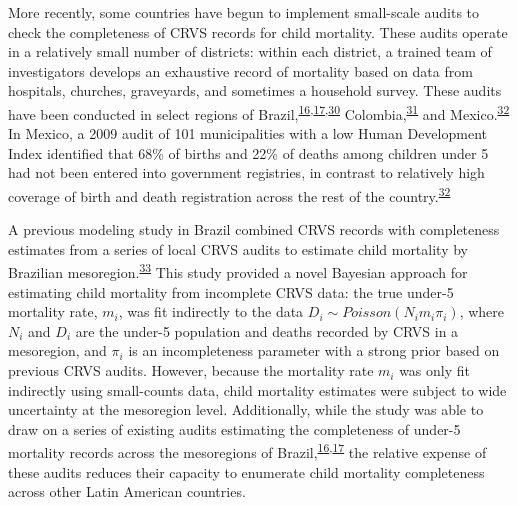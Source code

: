 \documentclass[
]{article}
\begin{document}
More recently, some countries have begun to implement small-scale audits to check the completeness of CRVS records for child mortality. These audits operate in a relatively small number of districts: within each district, a trained team of investigators develops an exhaustive record of mortality based on data from hospitals, churches, graveyards, and sometimes a household survey. These audits have been conducted in select regions of Brazil,\textsuperscript{\protect\hyperlink{ref-DeFrias2013}{16},\protect\hyperlink{ref-Szwarcwald2014}{17},\protect\hyperlink{ref-DeAlmeida2017a}{30}} Colombia,\textsuperscript{\protect\hyperlink{ref-NationalAdminstrativeDepartmentofStatisticsDANE2006}{31}} and Mexico.\textsuperscript{\protect\hyperlink{ref-Hernandez2012}{32}} In Mexico, a 2009 audit of 101 municipalities with a low Human Development Index identified that 68\% of births and 22\% of deaths among children under 5 had not been entered into government registries, in contrast to relatively high coverage of birth and death registration across the rest of the country.\textsuperscript{\protect\hyperlink{ref-Hernandez2012}{32}}

A previous modeling study in Brazil combined CRVS records with completeness estimates from a series of local CRVS audits to estimate child mortality by Brazilian mesoregion.\textsuperscript{\protect\hyperlink{ref-Schmertmann2018a}{33}} This study provided a novel Bayesian approach for estimating child mortality from incomplete CRVS data: the true under-5 mortality rate, \(m_i\), was fit indirectly to the data \(D_i \sim Poisson(N_im_i\pi_i)\), where \(N_i\) and \(D_i\) are the under-5 population and deaths recorded by CRVS in a mesoregion, and \(\pi_i\) is an incompleteness parameter with a strong prior based on previous CRVS audits. However, because the mortality rate \(m_i\) was only fit indirectly using small-counts data, child mortality estimates were subject to wide uncertainty at the mesoregion level. Additionally, while the study was able to draw on a series of existing audits estimating the completeness of under-5 mortality records across the mesoregions of Brazil,\textsuperscript{\protect\hyperlink{ref-DeFrias2013}{16},\protect\hyperlink{ref-Szwarcwald2014}{17}} the relative expense of these audits reduces their capacity to enumerate child mortality completeness across other Latin American countries.
\end{document}
